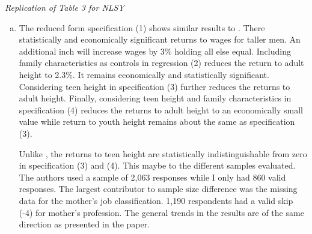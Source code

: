\documentclass[12pt]{article}
\begin{document}
\begin{table}[h!]
	
    \caption{\textit{Replication of \textcite{Persico2004} Table 3 for NLSY}} 
\end{table}
\begin{enumerate}[a.]
    \item The reduced form specification (1) shows similar results to 
    \textcite{Persico2004}.  There statistically and economically significant 
    returns to wages for taller men.  An additional inch will increase wages 
    by 3\% holding all else equal. Including family characteristics as 
    controls in regression (2) reduces the return to adult height to 2.3\%. 
    It remains economically and statistically significant. Considering teen 
    height in specification (3) further reduces the returns to adult height. 
    Finally, considering teen height and family characteristics in specification 
    (4) reduces the returns to adult height to an economically small value 
    while return to youth height remains about the same as specification (3). 
    
    Unlike \textcite{Persico2004}, the returns to teen height are statistically 
    indistinguishable from zero in specification (3) and (4). This 
    maybe to the different samples evaluated.  The authors used a sample of 
    2,063 responses while I only had 860 valid responses. The largest 
    contributor to sample size difference was the missing data for the mother's  
    job classification. 1,190 respondents had a valid skip (-4) for mother's 
    profession. The general trends in the results are of the same direction as 
    presented in the paper.
\end{enumerate}

\printbibliography 
\end{document}

